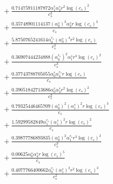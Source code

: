 \documentclass[10pt]{article}
\begin{document}
\begin{align*}
&{}  + \frac{0.71475911187872 \alpha_{1}^s \alpha_{2}^s r^{2} \log{\left(c_{s} \right)}^{2}}{c_{s}^{2}} \\
&{}  + \frac{0.35748901114137 \left(\alpha_{0}^s\right)^{3} \alpha_{2}^s r \log{\left(c_{s} \right)}^{3}}{c_{s}} \\
&{}  + \frac{5.8750765241614 \alpha_{0}^{c_s} \left(\alpha_{0}^s\right)^{4} r^{2} \log{\left(c_{s} \right)}}{c_{s}^{2}} \\
&{}  + \frac{0.36907444234888 \left(\alpha_{0}^{c_s}\right)^{2} \alpha_{1}^s r^{3} \log{\left(c_{s} \right)}^{2}}{c_{s}^{3}} \\
&{}  + \frac{0.37743788705055 \alpha_{0}^s \alpha_{4}^{c_s} r \log{\left(c_{s} \right)}}{c_{s}} \\
&{}  + \frac{0.39051842713686 \alpha_{0}^s \alpha_{3}^s r^{2} \log{\left(c_{s} \right)}^{2}}{c_{s}^{2}} \\
&{}  + \frac{0.79325446465709 \left(\alpha_{0}^s\right)^{2} \left(\alpha_{1}^s\right)^{2} r \log{\left(c_{s} \right)}^{3}}{c_{s}} \\
&{}  + \frac{1.59299582849 \alpha_{1}^{c_s} \left(\alpha_{1}^s\right)^{2} r \log{\left(c_{s} \right)}^{2}}{c_{s}} \\
&{}  + \frac{0.39877786893835 \left(\alpha_{0}^s\right)^{2} \alpha_{1}^{c_s} r^{3} \log{\left(c_{s} \right)}^{2}}{c_{s}^{3}} \\
&{}  + \frac{0.00625 \alpha_{0}^s \alpha_{4}^s r \log{\left(c_{s} \right)}^{5}}{c_{s}} \\
&{}  + \frac{0.4077766400662 \alpha_{0}^{c_s} \left(\alpha_{1}^s\right)^{2} r^{2} \log{\left(c_{s} \right)}^{3}}{c_{s}^{2}}
\end{align*}
\end{document}
